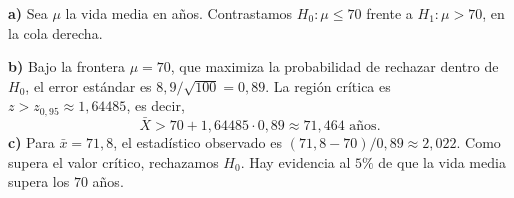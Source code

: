 \textbf{a)} Sea $\mu$ la vida media en años. Contrastamos $H_0:\mu\le70$ frente a $H_1:\mu>70$, en la cola derecha.

\textbf{b)} Bajo la frontera $\mu=70$, que maximiza la probabilidad de rechazar dentro de $H_0$, el error estándar es $8{,}9/\sqrt{100}=0{,}89$. La región crítica es $z>z_{0{,}95}\approx1{,}64485$, es decir,
\[
\bar X>70+1{,}64485\cdot0{,}89\approx71{,}464\text{ años}.
\]
\textbf{c)} Para $\bar x=71{,}8$, el estadístico observado es $(71{,}8-70)/0{,}89\approx2{,}022$. Como supera el valor crítico, rechazamos $H_0$. Hay evidencia al $5\%$ de que la vida media supera los $70$ años.

